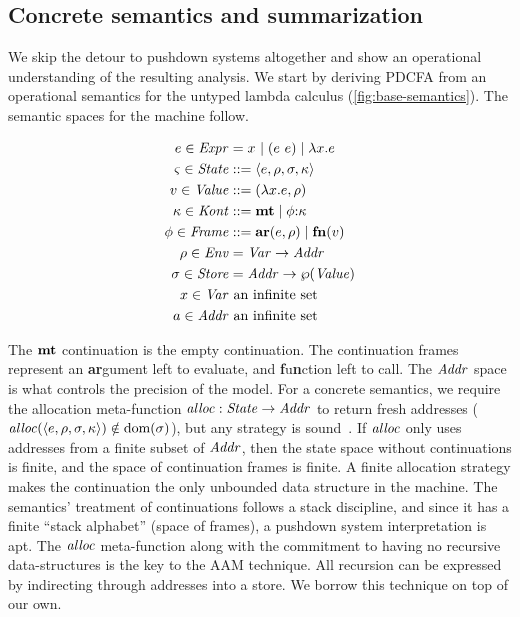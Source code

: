 \subsection{Concrete semantics and summarization}
We skip the detour to pushdown systems altogether and show an operational understanding of the resulting analysis.
%
We start by deriving PDCFA from an operational semantics for the untyped lambda calculus (\autoref{fig:base-semantics}).
%
The semantic spaces for the machine follow.

{
\setlength{\abovedisplayskip}{0pt}
\setlength{\belowdisplayskip}{4pt}
\setlength{\abovedisplayshortskip}{0pt}
\setlength{\belowdisplayshortskip}{8pt}
\begin{align*}
  e \in \mathit{Expr} &= x^{{}} \mathrel{\mid} (e\ e){} \mathrel{\mid} \lambda{} x. e \\
  \varsigma \in \mathit{State} &::= \langle e,\rho,\sigma,\kappa \rangle \\
  v \in \mathit{Value} &::= (\lambda{} x. e, \rho) \\
  \kappa \in \mathit{Kont} &::= \mathbf{mt} \mathrel{\mid} \phi{\tt :} \kappa \\
  \phi \in \mathit{Frame} &::= \mathbf{ar}{}(e,\rho) \mathrel{\mid} \mathbf{fn}{}(v) \\
  \rho \in \mathit{Env} &= \mathit{Var} \to \mathit{Addr} \\
  \sigma \in \mathit{Store} &= \mathit{Addr} \to \wp(\mathit{Value}) \\
  x \in \mathit{Var} &\text{ an infinite set} \\
  a \in \mathit{Addr} &\text{ an infinite set}
\end{align*}
}

%
The $\mathbf{mt}$ continuation is the empty continuation.
%
The continuation frames represent an \textbf{ar}gument left to evaluate, and \textbf{f}u\textbf{n}ction left to call.
%
%
The $\mathit{Addr}$ space is what controls the precision of the model.
%
For a concrete semantics, we require the allocation meta-function $\mathit{alloc} :
\mathit{State} \to \mathit{Addr}$ to return fresh addresses ($\mathit{alloc}(\langle e,\rho,\sigma,\kappa \rangle) \notin \text{dom}(\sigma)$), but any strategy is sound~\citep{dvanhorn:Might2009Posteriori}.
%
If $\mathit{alloc}$ only uses addresses from a finite subset of $\mathit{Addr}$, then the state space without continuations is finite, and the space of continuation frames is finite.
%
A finite allocation strategy makes the continuation the only unbounded data structure in the machine.
%
The semantics' treatment of continuations follows a stack discipline, and since it has a finite ``stack alphabet'' (space of frames), a pushdown system interpretation is apt.
%
The $\mathit{alloc}$ meta-function along with the commitment to having no recursive data-structures is the key to the AAM technique.
%
All recursion can be expressed by indirecting through addresses into a store.
%
We borrow this technique on top of our own.

